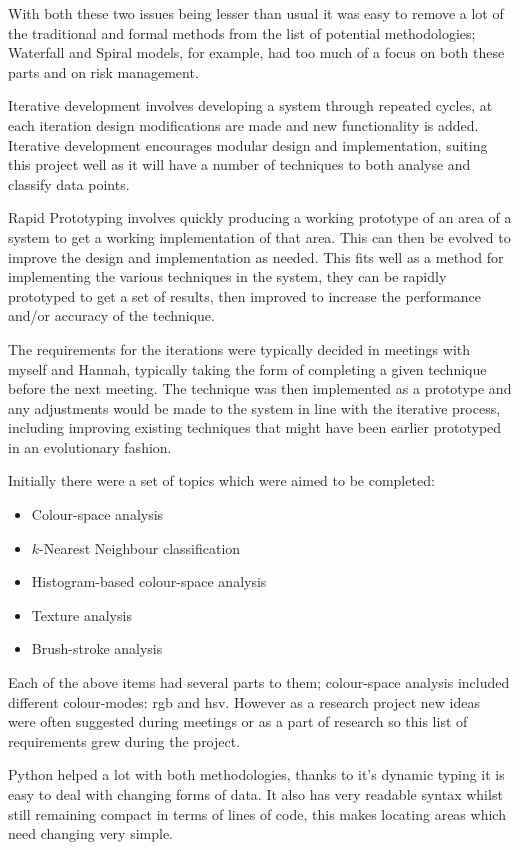 With both these two issues being lesser than usual it was easy to remove a lot of the traditional
and formal methods from the list of potential methodologies; Waterfall and Spiral models, for 
example, had too much of a focus on both these parts and on risk management.

Iterative development involves developing a system through repeated cycles, at each iteration 
design modifications are made and new functionality is added. Iterative development encourages 
modular design and implementation, suiting this project well as it will have a number of 
techniques to both analyse and classify data points.

Rapid Prototyping involves quickly producing a working prototype of an area of a system to get a
working implementation of that area. This can then be evolved to improve the design and 
implementation as needed. This fits well as a method for implementing the various techniques in 
the system, they can be rapidly prototyped to get a set of results, then improved to increase the
performance and/or accuracy of the technique.

The requirements for the iterations were typically decided in meetings with myself and Hannah, 
typically taking the form of completing a given technique before the next meeting. The technique
was then implemented as a prototype and any adjustments would be made to the system in line with
the iterative process, including improving existing techniques that might have been earlier 
prototyped in an evolutionary fashion.

Initially there were a set of topics which were aimed to be completed:

\begin{itemize}
\item Colour-space analysis
\item $k$-Nearest Neighbour classification
\item Histogram-based colour-space analysis
\item Texture analysis
\item Brush-stroke analysis
\end{itemize}

Each of the above items had several parts to them; colour-space analysis included different 
colour-modes: \gls{rgb} and \gls{hsv}. However as a research project new ideas were often 
suggested during meetings or as a part of research so this list of requirements grew during the
project.

Python helped a lot with both methodologies, thanks to it's dynamic typing it is easy to deal with
changing forms of data. It also has very readable syntax whilst still remaining compact in terms
of lines of code, this makes locating areas which need changing very simple.


